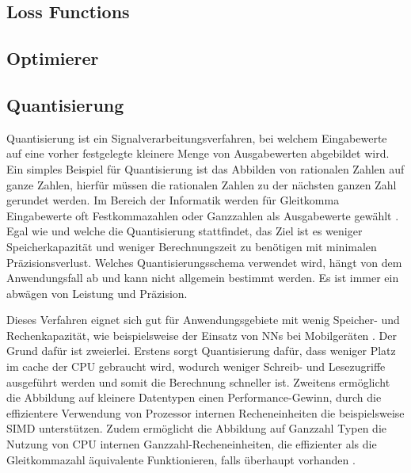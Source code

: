 \subsection{Loss Functions}


\subsection{Optimierer}


\subsection{Quantisierung}

Quantisierung ist ein Signalverarbeitungsverfahren, bei welchem Eingabewerte auf eine vorher festgelegte kleinere Menge von Ausgabewerten abgebildet wird. Ein simples Beispiel für Quantisierung ist das Abbilden von rationalen Zahlen auf ganze Zahlen, hierfür müssen die rationalen Zahlen zu der nächsten ganzen Zahl gerundet werden. Im Bereich der Informatik werden für Gleitkomma Eingabewerte oft Festkommazahlen oder Ganzzahlen als Ausgabewerte gewählt \cite{Gysel2016}. Egal wie und welche die Quantisierung stattfindet, das Ziel ist es weniger Speicherkapazität und weniger Berechnungszeit zu benötigen mit minimalen Präzisionsverlust. Welches Quantisierungsschema verwendet wird, hängt von dem Anwendungsfall ab und kann nicht allgemein bestimmt werden. Es ist immer ein abwägen von Leistung und Präzision.

Dieses Verfahren eignet sich gut für Anwendungsgebiete mit wenig Speicher- und Rechenkapazität, wie beispielsweise der Einsatz von \acp{NN} bei Mobilgeräten \cite{MaQuantization2019, Gysel2016}. Der Grund dafür ist zweierlei. Erstens sorgt Quantisierung dafür, dass weniger Platz im cache der CPU gebraucht wird, wodurch weniger Schreib- und Lesezugriffe ausgeführt werden und somit die Berechnung schneller ist. Zweitens ermöglicht die Abbildung auf kleinere Datentypen einen Performance-Gewinn, durch die effizientere Verwendung von Prozessor internen Recheneinheiten die beispielsweise \ac{SIMD} unterstützen. Zudem ermöglicht die Abbildung auf Ganzzahl Typen die Nutzung von CPU internen Ganzzahl-Recheneinheiten, die effizienter als die Gleitkommazahl äquivalente Funktionieren, falls überhaupt vorhanden \cite{Jacob2017}.

